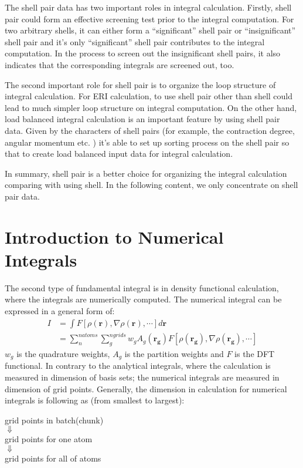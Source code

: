 The shell pair data has two important roles in integral calculation. Firstly,
shell pair could form an effective screening test prior to the integral computation.
For two arbitrary shells, it can either form a ``significant'' shell pair or 
``insignificant'' shell pair and it's only ``significant'' shell pair contributes
to the integral computation. In the process to screen out the insignificant shell
pairs, it also indicates that the corresponding integrals are screened out, too.

The second important role for shell pair is to organize the loop structure of 
integral calculation. For ERI calculation, to use shell pair other than shell
could lead to much simpler loop structure on integral computation. On the other 
hand, load balanced integral calculation is an important feature by using shell
pair data. Given by the characters of shell pairs (for example, the contraction 
degree, angular momentum etc. ) it's able to set up sorting process on the shell 
pair so that to create load balanced input data for integral calculation.

In summary, shell pair is a better choice for organizing the integral calculation
comparing with using shell. In the following content, we only concentrate on
shell pair data.

\section{Introduction to Numerical Integrals}
%
%
The second type of fundamental integral is in density functional calculation,
where the integrals are numerically computed. The numerical integral can be 
expressed in a general form of:
\begin{equation}
 \begin{split}
 I &= \int F[\rho(\bm{r}), \nabla\rho(\bm{r}), \cdots] d\bm{r} \\
   &=  \sum^{natoms}_{n}\sum^{ngrids}_{g}w_{g}A_{g}(\bm{r_{g}})
       F[\rho(\bm{r_{g}}), \nabla\rho(\bm{r_{g}}), \cdots] 
\end{split}
\end{equation}
$w_{g}$ is the quadrature weights, $A_{g}$ is the partition weights and $F$
is the DFT functional\cite{MHL,Becke,OR,EGM}. In contrary to the analytical
integrals, where the calculation is measured in dimension of basis sets;
the numerical integrals are measured in dimension of grid points. Generally,
the dimension in calculation for numerical integrals is following as (from
smallest to largest):
\begin{center}
 grid points in batch(chunk) \\
 $\Downarrow$ \\
  grid points for one atom \\
 $\Downarrow$ \\
  grid points for all of atoms 
\end{center}

